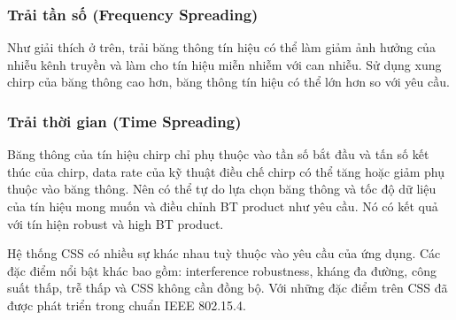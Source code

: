\subsubsection{	Trải tần số (Frequency Spreading)}
Như giải thích ở trên, trải băng thông tín hiệu có thể làm giảm ảnh hưởng của nhiễu kênh truyền và làm cho tín hiệu miễn nhiễm với can nhiễu. Sử dụng xung chirp của băng thông cao hơn, băng thông tín hiệu có thể lớn hơn so với yêu cầu.
\subsubsection{	Trải thời gian (Time Spreading)}

Băng thông của tín hiệu chirp chỉ phụ thuộc vào tần số bắt đầu và tấn số kết thúc của chirp, data rate của kỹ thuật điều chế chirp có thể tăng hoặc giảm phụ thuộc vào băng thông. Nên có thể tự do lựa chọn băng thông và tốc độ dữ liệu của tín hiệu mong muốn và điều chỉnh BT product như yêu cầu. Nó có kết quả với tín hiện robust và high BT product. \par 
	Hệ thống CSS có nhiều sự khác nhau tuỳ thuộc vào yêu cầu của ứng dụng. Các đặc điểm nổi bật khác bao gồm: interference robustness, kháng đa đường, công suất thấp, trễ thấp và CSS không cần đồng bộ. Với những đặc điểm trên CSS đã được phát triển trong chuẩn IEEE 802.15.4. 
	
